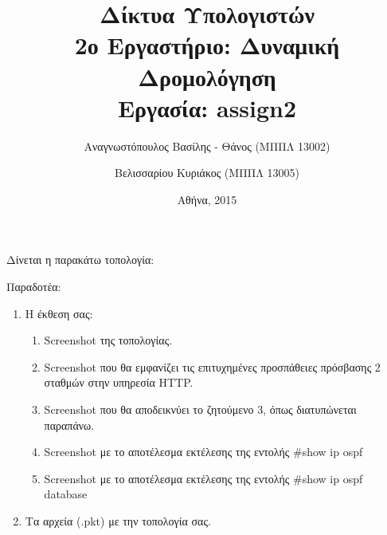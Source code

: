 \documentclass{assignment}
\title{Δίκτυα Υπολογιστών \\ 2ο Εργαστήριο: Δυναμική Δρομολόγηση \\ Εργασία: assign2}
\date{Αθήνα, 2015}
\author{Αναγνωστόπουλος Βασίλης - Θάνος (ΜΠΠΛ 13002) \and Βελισσαρίου Κυριάκος (ΜΠΠΛ 13005)}
\begin{document}
\maketitle

\setcounter{page}{1} 

\pagestyle{plain}
\tableofcontents
\newpage

\setcounter{page}{1} 


Δίνεται η παρακάτω τοπολογία:

\begin{center}
\end{center}
 
Παραδοτέα:

\begin{enumerate}
  \item Η έκθεση σας:
  \begin{enumerate}
     \item Screenshot της τοπολογίας.
     \item Screenshot που θα εμφανίζει τις επιτυχημένες προσπάθειες πρόσβασης 2 σταθμών στην υπηρεσία HTTP.
     \item Screenshot που θα αποδεικνύει το ζητούμενο 3, όπως διατυπώνεται παραπάνω.
     \item Screenshot με το αποτέλεσμα εκτέλεσης της εντολής \#show ip ospf
     \item Screenshot με το αποτέλεσμα εκτέλεσης της εντολής \#show ip ospf database
  \end{enumerate}
  \item Τα αρχεία (.pkt) με την τοπολογία σας.
\end{enumerate}
\end{document}

